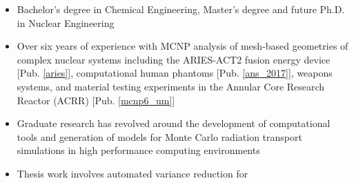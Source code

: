 \begin{center}
\begin{minipage}{\textwidth}
\begin{itemize}[leftmargin=.875in,rightmargin=.875in,itemsep=1.0mm]
               \item Bachelor's degree in Chemical Engineering, Master's degree
		       and future Ph.D. in Nuclear Engineering
                \item Over six years of experience with MCNP analysis of
			mesh-based geometries of complex nuclear
		      systems including the ARIES-ACT2 fusion energy device
		      [Pub. \ref{aries}],
		      computational human phantoms
		      [Pub. \ref{ans_2017}], weapons systems, and material testing
		      experiments in the
		      Annular Core Research Reactor (ACRR) [Pub.
		      \ref{mcnp6_um}]
	       \item Graduate research has revolved around the development of
		       computational tools 
		       and generation of models for Monte Carlo radiation transport
		       simulations
		       in high performance computing environments
	       \item Thesis work involves automated variance reduction for

\end{itemize}
\end{minipage}
\end{center}

